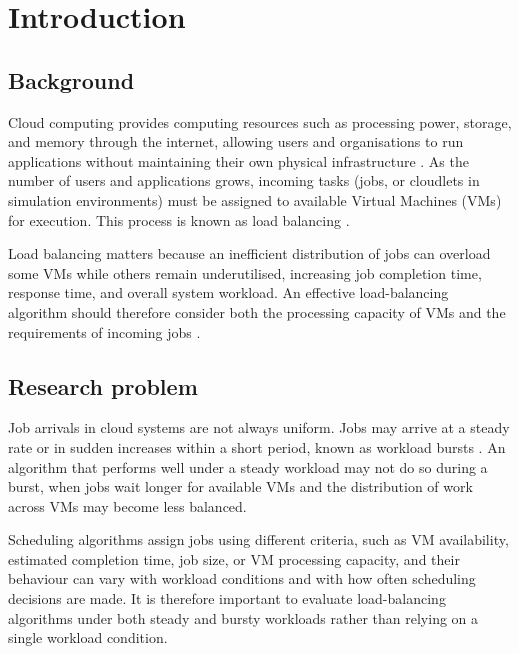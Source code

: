 \documentclass[default,sn-mathphys,Numbered]{sn-jnl}
\begin{document}

\maketitle

\section{Introduction}\label{sec:intro}

\subsection{Background}
Cloud computing provides computing resources such as processing power, storage, and memory through the internet, allowing users and organisations to run applications without maintaining their own physical infrastructure \cite{armbrust2010view, buyya2009cloud}. As the number of users and applications grows, incoming tasks (jobs, or cloudlets in simulation environments) must be assigned to available Virtual Machines (VMs) for execution. This process is known as load balancing \cite{shafiq2022review}.

Load balancing matters because an inefficient distribution of jobs can overload some VMs while others remain underutilised, increasing job completion time, response time, and overall system workload. An effective load-balancing algorithm should therefore consider both the processing capacity of VMs and the requirements of incoming jobs \cite{kumar2019comprehensive}.

\subsection{Research problem}
Job arrivals in cloud systems are not always uniform. Jobs may arrive at a steady rate or in sudden increases within a short period, known as workload bursts \cite{mi2008burstiness, bodik2010spikes}. An algorithm that performs well under a steady workload may not do so during a burst, when jobs wait longer for available VMs and the distribution of work across VMs may become less balanced.

Scheduling algorithms assign jobs using different criteria, such as VM availability, estimated completion time, job size, or VM processing capacity, and their behaviour can vary with workload conditions and with how often scheduling decisions are made. It is therefore important to evaluate load-balancing algorithms under both steady and bursty workloads rather than relying on a single workload condition.
\end{document}

